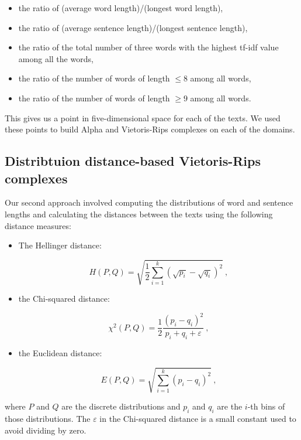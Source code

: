 \documentclass[12pt,a4paper]{amsart}
\begin{document}
\begin{itemize}
  \item the ratio of (average word length)/(longest word length),
  \item the ratio of (average sentence length)/(longest sentence length),
  \item the ratio of the total number of three words with the highest tf-idf
    value among all the words,
  \item the ratio of the number of words of length $\le 8$ among all words,
  \item the ratio of the number of words of length $\ge 9$ among all words.
\end{itemize}

This gives us a point in five-dimensional space for each of the texts. We used
these points to build Alpha and Vietoris-Rips complexes on each of the domains.

\subsection{Distribtuion distance-based Vietoris-Rips complexes}

Our second approach involved computing the distributions of word and sentence
lengths and calculating the distances between the texts using the following
distance measures:

\begin{itemize}
\item The Hellinger distance:

\begin{equation*}
  H(P,Q) = \sqrt{\frac{1}{2} \sum_{i=1}^k\left(\sqrt{p_i} -
    \sqrt{q_i}\right)^2}\ ,
\end{equation*}

\item the Chi-squared distance:

\begin{equation*}
  \chi^2(P,Q) = \frac{1}{2} \frac{(p_i - q_i)^2}{p_i + q_i + \varepsilon}\ ,
\end{equation*}

\item the Euclidean distance:

\begin{equation*}
  E(P,Q) = \sqrt{\sum_{i=1}^k\left(p_i - q_i\right)^2}\ ,
\end{equation*}
\end{itemize}

\noindent
where $P$ and $Q$ are the discrete distributions and $p_i$ and $q_i$ are the
$i$-th bins of those distributions. The $\varepsilon$ in the Chi-squared
distance is a small constant used to avoid dividing by zero.
\end{document}
